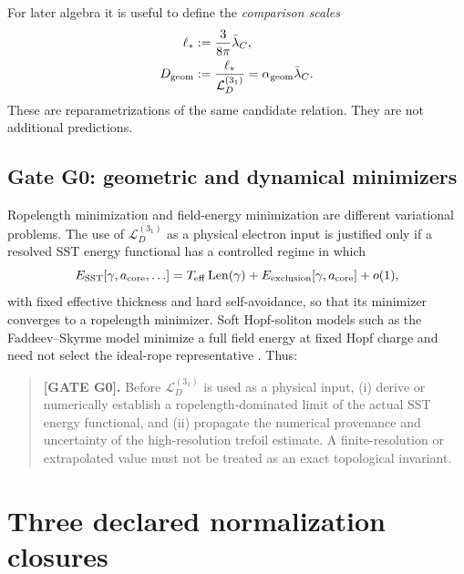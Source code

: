 \documentclass[aps,pre,preprint,notitlepage,nofootinbib,superscriptaddress]{revtex4-2}
\newcommand{\lC}{\bar\lambda_C}
\newcommand{\calL}{\mathcal L}
\begin{document}
For later algebra it is useful to define the \emph{comparison scales}
\begin{align}
  \ell_* &:=\frac{3}{8\pi}\lC,
  \label{eq:ellstar}\\
  D_{\rm geom}
  &:=\frac{\ell_*}{\calL_D^{(3_1)}}
  =\alpha_{\rm geom}\lC.
  \label{eq:Dgeom}
\end{align}
These are reparametrizations of the same candidate relation.  They are not additional predictions.

\subsection{Gate G0: geometric and dynamical minimizers}
\label{subsec:G0}

Ropelength minimization and field-energy minimization are different variational problems.  The use of \(\calL_D^{(3_1)}\) as a physical electron input is justified only if a resolved SST energy functional has a controlled regime in which
\begin{equation}
  E_{\rm SST}[\gamma,a_{\rm core},\ldots]
  =
  T_{\rm eff}\operatorname{Len}(\gamma)
  +E_{\rm exclusion}[\gamma,a_{\rm core}]
  +o(1),
  \label{eq:hard-tube-limit}
\end{equation}
with fixed effective thickness and hard self-avoidance, so that its minimizer converges to a ropelength minimizer.  Soft Hopf-soliton models such as the Faddeev--Skyrme model minimize a full field energy at fixed Hopf charge and need not select the ideal-rope representative \cite{Sutcliffe2007}.  Thus:

\begin{quote}
\textbf{[GATE G0].}
Before \(\calL_D^{(3_1)}\) is used as a physical input, (i) derive or numerically establish a ropelength-dominated limit of the actual SST energy functional, and (ii) propagate the numerical provenance and uncertainty of the high-resolution trefoil estimate.  A finite-resolution or extrapolated value must not be treated as an exact topological invariant.
\end{quote}

\section{Three declared normalization closures}
\label{sec:closures}
\end{document}
